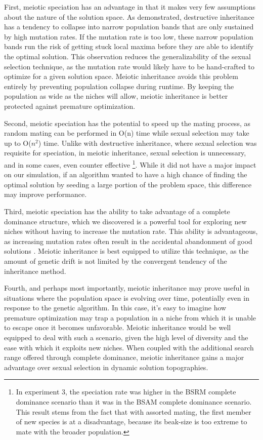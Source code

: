 \documentclass{article}
\begin{document}
First, meiotic speciation has an advantage in that it makes very few assumptions about the nature of the solution space. As demonstrated, destructive inheritance has a tendency to collapse into narrow population bands that are only sustained by high mutation rates. If the mutation rate is too low, these narrow population bands run the risk of getting stuck local maxima before they are able to identify the optimal solution. This observation reduces the generalizability of the sexual selection technique, as the mutation rate would likely have to be hand-crafted to optimize for a given solution space. Meiotic inheritance avoids this problem entirely by preventing population collapse during runtime. By keeping the population as wide as the niches will allow, meiotic inheritance is better protected against premature optimization.

Second, meiotic speciation has the potential to speed up the mating process, as random mating can be performed in O(n) time while sexual selection may take up to O($n^2$) time. Unlike with destructive inheritance, where sexual selection was requisite for speciation, in meiotic inheritance, sexual selection is unnecessary, and in some cases, even counter effective \footnote{In experiment 3, the speciation rate was higher in the BSRM complete dominance scenario than it was in the BSAM complete dominance scenario. This result stems from the fact that with assorted mating, the first member of new species is at a disadvantage, because its beak-size is too extreme to mate with the broader population.}. While it did not have a major impact on our simulation, if an algorithm wanted to have a high chance of finding the optimal solution by seeding a large portion of the problem space, this difference may improve performance. 

Third, meiotic speciation has the ability to take advantage of a complete dominance structure, which we discovered is a powerful tool for exploring new niches without having to increase the mutation rate. This ability is advantageous, as increasing mutation rates often result in the accidental abandonment of good solutions \cite{TAGGING}. Meiotic inheritance is best equipped to utilize this technique, as the amount of genetic drift is not limited by the convergent tendency of the inheritance method.

Fourth, and perhaps most importantly, meiotic inheritance may prove useful in situations where the population space is evolving over time, potentially even in response to the genetic algorithm. In this case, it's easy to imagine how premature optimization may trap a population in a niche from which it is unable to escape once it becomes unfavorable. Meiotic inheritance would be well equipped to deal with such a scenario, given the high level of diversity and the ease with which it exploits new niches. When coupled with the additional search range offered through complete dominance, meiotic inheritance gains a major advantage over sexual selection in dynamic solution topographies. 
\end{document}
